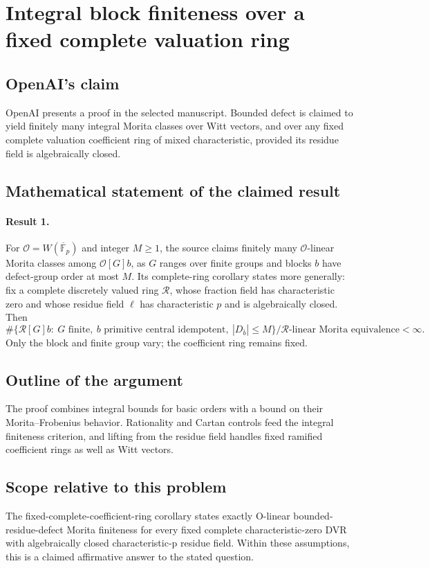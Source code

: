 \documentclass[11pt]{article}
\begin{document}
\section*{Integral block finiteness over a fixed complete valuation ring}

\subsection{OpenAI's claim}
OpenAI presents a proof in the selected manuscript. Bounded defect is claimed to yield finitely many integral Morita classes over Witt vectors, and over any fixed complete valuation coefficient ring of mixed characteristic, provided its residue field is algebraically closed.

\subsection{Mathematical statement of the claimed result}
\paragraph{Result 1.} For \(\mathcal O=W(\overline{\mathbb F}_p)\) and integer \(M\ge1\), the source claims finitely many \(\mathcal O\)-linear Morita classes among \(\mathcal O[G]b\), as \(G\) ranges over finite groups and blocks \(b\) have defect-group order at most \(M\). Its complete-ring corollary states more generally: fix a complete discretely valued ring \(\mathcal R\), whose fraction field has characteristic zero and whose residue field \(\ell\) has characteristic \(p\) and is algebraically closed. Then
\[
 \#\{\mathcal R[G]b:\ G\text{ finite},\ b\text{ primitive central idempotent},\ |D_{\bar b}|\le M\}/\mathcal R\text{-linear Morita equivalence}<\infty.
\]
Only the block and finite group vary; the coefficient ring remains fixed.

\subsection{Outline of the argument}
The proof combines integral bounds for basic orders with a bound on their Morita--Frobenius behavior. Rationality and Cartan controls feed the integral finiteness criterion, and lifting from the residue field handles fixed ramified coefficient rings as well as Witt vectors.

\subsection{Scope relative to this problem}
The fixed-complete-coefficient-ring corollary states exactly O-linear bounded-residue-defect Morita finiteness for every fixed complete characteristic-zero DVR with algebraically closed characteristic-p residue field. Within these assumptions, this is a claimed affirmative answer to the stated question.
\end{document}
